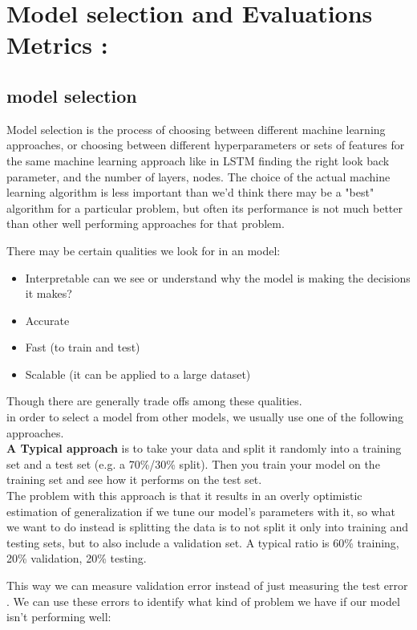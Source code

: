 
\chapter{Model selection and Evaluations Metrics :}\label{descriptors}

\section{model selection}\label{variance_bias}
Model selection is the process of choosing between different machine learning approaches,  or choosing between different hyperparameters or sets of features for the same machine learning approach  like in LSTM  finding the right look back parameter, and the number of layers, nodes.
The choice of the actual machine learning algorithm is less important than we'd think  there may be a "best" algorithm for a particular problem, but often its performance is not much better than other well performing approaches for that problem.

There may be certain qualities we look for in an model:
\begin{itemize}
\item Interpretable   can we see or understand why the model is making the decisions it makes?
\item Accurate
\item Fast (to train and test)
\item Scalable (it can be applied to a large dataset)
\end{itemize}
Though there are generally trade offs among these qualities.\\in order to select a model from other models, we usually use one of the following approaches.\\\textbf{A Typical approach } is to take your data and split it randomly into a training set and a test set (e.g. a 70\%/30\% split). Then you train your model on the training set and see how it performs on the test set.\\The problem with this approach is that it results in an overly optimistic estimation of generalization if we tune our model's parameters with it,  so what we want to do instead is splitting the data is to not split it only into training and testing sets, but to also include a validation set. A typical ratio is 60\% training, 20\% validation, 20\% testing.

This way we can measure validation error instead of just measuring the test error .
We can use these errors   to identify what kind of problem we have if our model isn't performing well:

